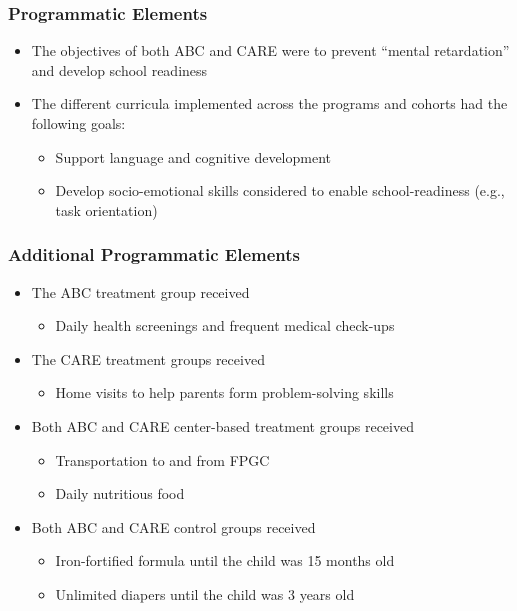 \documentclass[static]{JJH-Beamer}
\begin{document}
\clearpage
\begin{frame}
 \addtocounter{framenumber}{-1}
\frametitle{Programmatic Elements}

\begin{itemize}
\item The objectives of both ABC and CARE were to prevent ``mental retardation'' and develop school readiness
\item The different curricula implemented across the programs and cohorts had the following goals:
	\begin{itemize}
    \item Support language and cognitive development
	\item Develop socio-emotional skills considered to enable school-readiness (e.g., task orientation)
	\end{itemize}
\end{itemize}

\end{frame}

\begin{frame}
 \addtocounter{framenumber}{-1}
\frametitle{Additional Programmatic Elements}

\begin{itemize}
\item The ABC treatment group received
	\begin{itemize}
	\item Daily health screenings and frequent medical check-ups
	\end{itemize}
\item The CARE treatment groups received
	\begin{itemize}
	\item Home visits to help parents form problem-solving skills
	\end{itemize}
\item Both ABC and CARE center-based treatment groups received
	\begin{itemize}
	\item Transportation to and from FPGC
	\item Daily nutritious food
	\end{itemize}
\item Both ABC and CARE control groups received
	\begin{itemize}
	\item Iron-fortified formula until the child was 15 months old
	\item Unlimited diapers until the child was 3 years old
	\end{itemize}
\end{itemize}

\end{frame}
\end{document}
